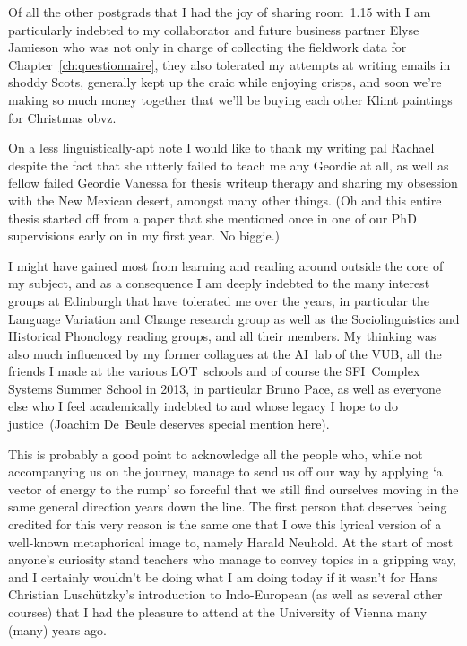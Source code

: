 \documentclass[oneside]{book}
\begin{document}
Of all the other postgrads that I had the joy of sharing room~1.15 with I am particularly indebted to my collaborator and future business partner Elyse Jamieson who was not only in charge of collecting the fieldwork data for Chapter~\ref{ch:questionnaire}, they also tolerated my attempts at writing emails in shoddy Scots, generally kept up the craic while enjoying crisps, and soon we're making so much money together that we'll be buying each other Klimt paintings for Christmas obvz.

On a less linguistically-apt note I would like to thank my writing pal Rachael despite the fact that she utterly failed to teach me any Geordie at all, as well as fellow failed Geordie Vanessa for thesis writeup therapy and sharing my obsession with the New Mexican desert, amongst many other things. (Oh and this entire thesis started off from a paper that she mentioned once in one of our PhD supervisions early on in my first year. No biggie.)

I might have gained most from learning and reading around outside the core of my subject, and as a consequence I am deeply indebted to the many interest groups at Edinburgh that have tolerated me over the years, in particular the Language Variation and Change research group as well as the Sociolinguistics and Historical Phonology reading groups, and all their members. My thinking was also much influenced by my former collagues at the AI~lab of the VUB, all the friends I made at the various LOT~schools and of course the SFI~Complex Systems Summer School in 2013, in particular Bruno Pace, as well as everyone else who I feel academically indebted to and whose legacy I hope to do justice~(Joachim De~Beule deserves special mention here).

This is probably a good point to acknowledge all the people who, while not accompanying us on the journey, manage to send us off our way by applying `a vector of energy to the rump' so forceful that we still find ourselves moving in the same general direction years down the line.
The first person that deserves being credited for this very reason is the same one that I owe this lyrical version of a well-known metaphorical image to, namely Harald Neuhold. At the start of most anyone's curiosity stand teachers who manage to convey topics in a gripping way, and I certainly wouldn't be doing what I am doing today if it wasn't for Hans Christian Luschützky's introduction to Indo-European (as well as several other courses) that I had the pleasure to attend at the University of Vienna many (many) years ago.
\end{document}
